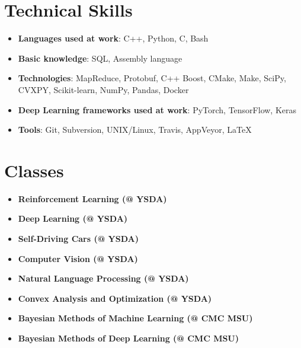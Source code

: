 \documentclass[letterpaper,11pt]{article}
\newcommand{\resumeItem}[2]{
  \item\small{
    \textbf{#1}{: #2 \vspace{-2pt}}
  }
}
\newcommand{\resumeSubItem}[2]{\resumeItem{#1}{#2}\vspace{-4pt}}
\newcommand{\resumeSubHeadingListStart}{\begin{itemize}[leftmargin=*]}
\newcommand{\resumeSubHeadingListEnd}{\end{itemize}}
\begin{document}
\vspace{-22pt}
\section{Technical Skills}
  \resumeSubHeadingListStart
    \resumeSubItem{Languages used at work}{C++, Python, C, Bash}
    \resumeSubItem{Basic knowledge}{SQL, Assembly language}
    \resumeSubItem{Technologies}{MapReduce, Protobuf, C++ Boost, CMake, Make, SciPy, CVXPY, Scikit-learn, NumPy, Pandas, Docker}
    \resumeSubItem{Deep Learning frameworks used at work}{PyTorch, TensorFlow, Keras}
    \resumeSubItem{Tools}{Git, Subversion, UNIX/Linux, Travis, AppVeyor, \LaTeX}
  \resumeSubHeadingListEnd


\vspace{-23pt}
\section{Classes}
  \resumeSubHeadingListStart
      \vspace{-4pt}
      \item{
        \textbf{Reinforcement Learning (@ YSDA)} \\
      }
      \vspace{-4pt}
      \item{
        \textbf{Deep Learning (@ YSDA)} \\
      }
      \vspace{-4pt}
      \item{
        \textbf{Self-Driving Cars (@ YSDA)} \\
      }
      \vspace{-4pt}
      \item{
        \textbf{Computer Vision (@ YSDA)} \\
      }
      \vspace{-4pt}
      \item{
        \textbf{Natural Language Processing (@ YSDA)} \\
      }
      \vspace{-4pt}
      \item{
        \textbf{Convex Analysis and Optimization (@ YSDA)} \\
      }
      \vspace{-4pt}
      \item{
        \textbf{Bayesian Methods of Machine Learning (@ CMC MSU)} \\
      }
      \vspace{-4pt}
      \item{
        \textbf{Bayesian Methods of Deep Learning (@ CMC MSU)} \\
      }
      \resumeSubHeadingListEnd
\end{document}
